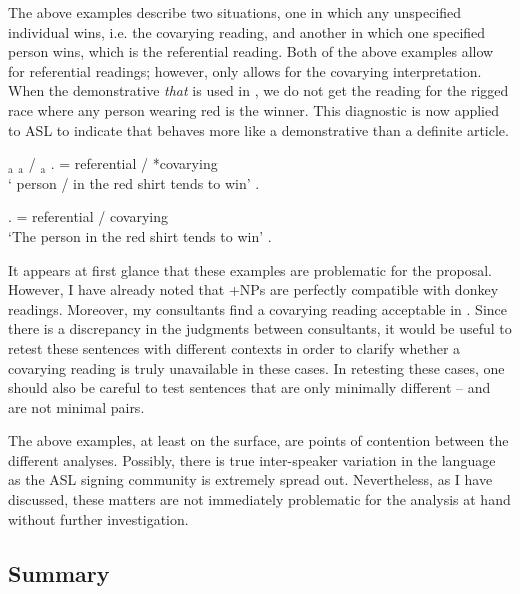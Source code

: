 \documentclass[output=paper,
modfonts
]{langscibook}
\begin{document}
The above examples describe two situations, one in which any unspecified individual wins, i.e. the covarying reading, and another in which one specified person wins, which is the referential reading. Both of the above examples allow for referential readings; however, only  allows for the covarying interpretation. When the demonstrative \textit{that} is used in , we do not get the reading for the rigged race where any person wearing red is the winner. This diagnostic is now applied to ASL to indicate that  behaves more like a demonstrative than a definite article. 

\begin{exe}
	\ex \label{ex:irani:86} {$_\text{a}$ $_\text{a}$ / $_\text{a}$} . = referential / *covarying\\ 
	` person /  in the red shirt tends to win' \citep[237]{KoulidobrovaLilloMartin2016}.
	
	\ex \label{ex:irani:87} . = referential / covarying \\
	`The person in the red shirt tends to win’ \citep[237]{KoulidobrovaLilloMartin2016}.
\end{exe}

It appears at first glance that these examples are problematic for the proposal. However, I have already noted that +NPs are perfectly compatible with donkey readings. Moreover, my consultants find a covarying reading acceptable in . Since there is a discrepancy in the judgments between consultants, it would be useful to retest these sentences with different contexts in order to clarify whether a covarying reading is truly unavailable in these cases. In retesting these cases, one should also be careful to test sentences that are only minimally different --  and  are not minimal pairs. 

The above examples, at least on the surface, are points of contention between the different analyses. Possibly, there is true inter-speaker variation in the language as the ASL signing community is extremely spread out. Nevertheless, as I have discussed, these matters are not immediately problematic for the analysis at hand without further investigation. 

\subsection{Summary}
\end{document}
